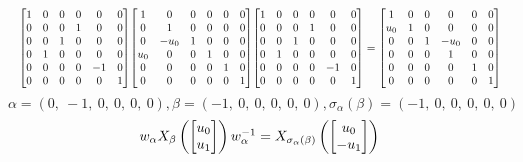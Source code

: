 \documentclass[11pt]{article}
\theoremstyle{definition}
\begin{document}
\[
\scaletoalign{\textwidth}{{\left[\begin{matrix}1 & 0 & 0 & 0 & 0 & 0\\0 & 0 & 0 & 1 & 0 & 0\\0 & 0 & 1 & 0 & 0 & 0\\0 & 1 & 0 & 0 & 0 & 0\\0 & 0 & 0 & 0 & -1 & 0\\0 & 0 & 0 & 0 & 0 & 1\end{matrix}\right]} {\left[\begin{matrix}1 & 0 & 0 & 0 & 0 & 0\\0 & 1 & 0 & 0 & 0 & 0\\0 & - u_{0} & 1 & 0 & 0 & 0\\u_{0} & 0 & 0 & 1 & 0 & 0\\0 & 0 & 0 & 0 & 1 & 0\\0 & 0 & 0 & 0 & 0 & 1\end{matrix}\right]} {\left[\begin{matrix}1 & 0 & 0 & 0 & 0 & 0\\0 & 0 & 0 & 1 & 0 & 0\\0 & 0 & 1 & 0 & 0 & 0\\0 & 1 & 0 & 0 & 0 & 0\\0 & 0 & 0 & 0 & -1 & 0\\0 & 0 & 0 & 0 & 0 & 1\end{matrix}\right]} = {\left[\begin{matrix}1 & 0 & 0 & 0 & 0 & 0\\u_{0} & 1 & 0 & 0 & 0 & 0\\0 & 0 & 1 & - u_{0} & 0 & 0\\0 & 0 & 0 & 1 & 0 & 0\\0 & 0 & 0 & 0 & 1 & 0\\0 & 0 & 0 & 0 & 0 & 1\end{matrix}\right]}}
\]
\[
\alpha = \left( 0, \  -1, \  0, \  0, \  0, \  0\right), \beta = \left( -1, \  0, \  0, \  0, \  0, \  0\right), \sigma_{\alpha}(\beta) = \left( -1, \  0, \  0, \  0, \  0, \  0\right)
\]
\[
\scaletoalign{\textwidth}{w_{\alpha} X_{\beta}\left(\left[\begin{matrix}u_{0}\\u_{1}\end{matrix}\right]\right) w_{\alpha}^{-1} = X_{\sigma_{\alpha}\left(\beta\right)}\left(\left[\begin{matrix}u_{0}\\- u_{1}\end{matrix}\right]\right)}
\]
\end{document}

